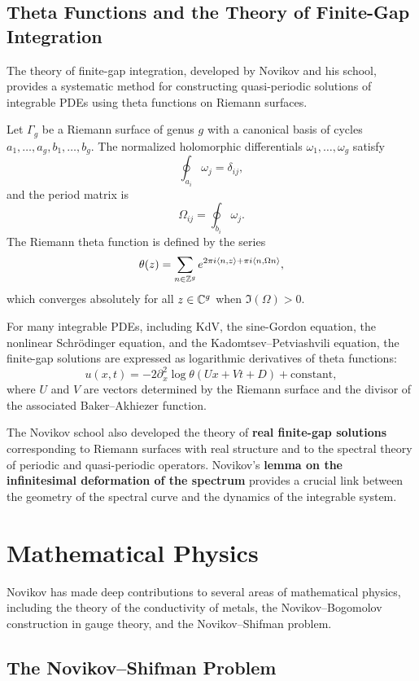 \subsection{Theta Functions and the Theory of Finite-Gap Integration}

The theory of finite-gap integration, developed by Novikov and his school, provides a systematic method for constructing quasi-periodic solutions of integrable PDEs using theta functions on Riemann surfaces.

Let \(\Gamma_g\) be a Riemann surface of genus \(g\) with a canonical basis of cycles \(a_1,\dots,a_g, b_1,\dots,b_g\). The normalized holomorphic differentials \(\omega_1,\dots,\omega_g\) satisfy
\[
\oint_{a_i} \omega_j = \delta_{ij},
\]
and the period matrix is
\[
\Omega_{ij} = \oint_{b_i} \omega_j.
\]
The Riemann theta function is defined by the series
\[
\theta(z) = \sum_{n \in \mathbb{Z}^g} e^{2\pi i \langle n, z \rangle + \pi i \langle n, \Omega n \rangle},
\]
which converges absolutely for all \(z \in \mathbb{C}^g\) when \(\Im(\Omega) > 0\).

For many integrable PDEs, including KdV, the sine-Gordon equation, the nonlinear Schr\"odinger equation, and the Kadomtsev--Petviashvili equation, the finite-gap solutions are expressed as logarithmic derivatives of theta functions:
\[
u(x,t) = -2 \partial_x^2 \log \theta(Ux + Vt + D) + \text{constant},
\]
where \(U\) and \(V\) are vectors determined by the Riemann surface and the divisor of the associated Baker--Akhiezer function.

The Novikov school also developed the theory of \textbf{real finite-gap solutions} corresponding to Riemann surfaces with real structure and to the spectral theory of periodic and quasi-periodic operators. Novikov's \textbf{lemma on the infinitesimal deformation of the spectrum} provides a crucial link between the geometry of the spectral curve and the dynamics of the integrable system.

\section{Mathematical Physics}

Novikov has made deep contributions to several areas of mathematical physics, including the theory of the conductivity of metals, the Novikov--Bogomolov construction in gauge theory, and the Novikov--Shifman problem.

\subsection{The Novikov--Shifman Problem}

